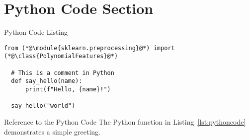 \section{Python Code Section}
\label{python_code_section}

\begin{frame}[fragile]{Python Code Listing}
    \begin{lstlisting}[caption={Sample Python Code}, label=lst:pythoncode]
  from (*@\module{sklearn.preprocessing}@*) import (*@\class{PolynomialFeatures}@*)
 
  # This is a comment in Python
  def say_hello(name):
      print(f"Hello, {name}!")
  
  say_hello("world")
    \end{lstlisting}
  \end{frame}
  
  \begin{frame}{Reference to the Python Code}
    The Python function in Listing~\ref{lst:pythoncode} demonstrates a simple greeting.
  \end{frame}
  